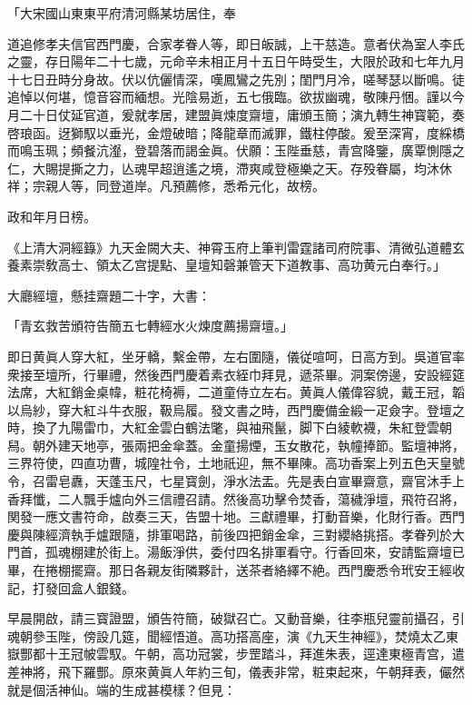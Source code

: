 \begin{myquote}[\markfont]
「大宋國山東東平府清河縣某坊居住，奉

道追修孝夫信官西門慶，合家孝眷人等，即日皈誠，上干慈造。意者伏為室人李氏之靈，存日陽年二十七歲，元命辛未相正月十五日午時受生，大限於政和七年九月十七日丑時分身故。伏以伉儷情深，嘆鳳鸞之先別；閨門月冷，嗟琴瑟以斷鳴。徒追悼以何堪，憶音容而緬想。光陰易逝，五七俄臨。欲拔幽魂，敬陳丹悃。謹以今月二十日仗延官道，爰就孝居，建盟眞煉度齋壇，庸頒玉簡；演九轉生神寳範，奏啓琅函。迓獅馭以垂光，金燈破暗；降龍章而滅罪，鐵柱停酸。爰至深宵，度綵橋而鳴玉珮；頻餐沆瀣，登碧落而謁金眞。伏願：玉陛垂慈，青宫降鑒，廣覃惻隱之仁，大賜提撕之力，亾魂早超逍遙之境，滯爽咸登極樂之天。存殁眷屬，均沐休祥；宗親人等，同登道岸。凡預薦修，悉希元化，故榜。　

政和年月日榜。

《上清大洞經籙》九天金闕大夫、神霄玉府上筆判雷霆諸司府院事、清微弘道體玄養素崇敎高士、領太乙宫提點、皇壇知磬兼管天下道教事、高功黄元白奉行。」
\end{myquote}

大廳經壇，懸挂齋題二十字，大書：

\begin{myquote}[\markfont]
「青玄救苦頒符告簡五七轉經水火煉度薦揚齋壇。」
\end{myquote}

即日黄眞人穿大紅，坐牙轎，繫金帶，左右圍隨，儀従喧呵，日高方到。吳道官率衆接至壇所，行畢禮，然後西門慶着素衣絰巾拜見，遞茶畢。洞案傍邊，安設經筵法席，大紅銷金桌幃，粧花椅褥，二道童侍立左右。黄眞人儀偉容貌，戴王冠，韜以烏紗，穿大紅斗牛衣服，靸烏履。發文書之時，西門慶備金緞一疋僉字。登壇之時，換了九陽雷巾，大紅金雲白鶴法氅，與袖飛鬣，脚下白綾軟襪，朱紅登雲朝舄。朝外建天地亭，張兩把金傘蓋。金童揚煙，玉女散花，執幢捧節。監壇神將，三界符使，四直功曹，城隍社令，土地祇迎，無不畢陳。高功香案上列五色天皇號令，召雷皂纛，天蓬玉尺，七星寳劍，淨水法盂。先是表白宣畢齋意，齋官沐手上香拜懺，二人飄手爐向外三信禮召請。然後高功擊令焚香，蕩穢淨壇，飛符召將，関發一應文書符命，啟奏三天，告盟十地。三獻禮畢，打動音樂，化財行香。西門慶與陳經濟執手爐跟隨，排軍喝路，前後四把銷金傘，三對纓絡挑搭。孝眷列於大門首，孤魂棚建於街上。湯飯淨供，委付四名排軍看守。行香回來，安請監齋壇已畢，在捲棚擺齋。那日各親友街隣夥計，送茶者絡繹不絶。西門慶悉令玳安王經收記，打發回盒人銀錢。

早晨開啟，請三寳證盟，頒告符簡，破獄召亡。又動音樂，往李瓶兒靈前攝召，引魂朝參玉陛，傍設几筵，聞經悟道。高功搭高座，演《九天生神經》，焚燒太乙東嶽酆都十王冠帔雲馭。午朝，高功冠裳，步罡踏斗，拜進朱表，逕達東極青宫，遣差神將，飛下羅酆。原來黄眞人年約三旬，儀表非常，粧束起來，午朝拜表，儼然就是個活神仙。端的生成甚模樣？但見：

